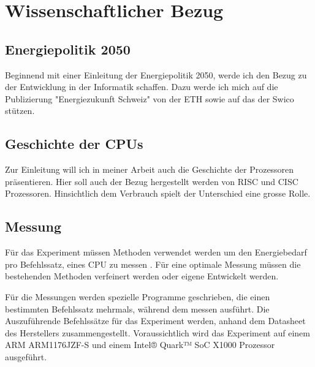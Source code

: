 \chapter{Wissenschaftlicher Bezug}

\section{Energiepolitik 2050}
Beginnend mit einer Einleitung der Energiepolitik 2050, werde ich den Bezug zu der Entwicklung in der
Informatik schaffen. Dazu werde ich mich auf die Publizierung
"Energiezukunft Schweiz"\cite{eth_energiezukunft_schweiz} von der ETH sowie auf das\cite{swico_datenblatt}
der Swico stützen.

\section{Geschichte der CPUs}
Zur Einleitung will ich in meiner Arbeit auch die Geschichte der Prozessoren präsentieren. Hier soll auch der Bezug
hergestellt werden von RISC und CISC Prozessoren. Hinsichtlich dem Verbrauch spielt der Unterschied eine grosse
Rolle.\cite{stanford_risc_cisc}


\section{Messung}
Für das Experiment müssen Methoden verwendet werden um den Energiebedarf pro Befehlssatz, eines CPU zu messen
\cite{measuring_power_temperature, analysis_circuits, intel_epi}. Für eine optimale Messung müssen die bestehenden Methoden
verfeinert werden oder eigene Entwickelt werden.
\par
Für die Messungen werden spezielle Programme geschrieben, die einen bestimmten Befehlssatz mehrmals, während dem messen
ausführt. Die Auszuführende Befehlssätze für das Experiment werden, anhand dem Datasheet des Herstellers zusammengestellt.
Voraussichtlich wird das Experiment auf einem ARM ARM1176JZF-S\cite{arm_datasheet} und einem Intel® Quark™ SoC
X1000 \cite{intel_datasheet} Prozessor ausgeführt.


